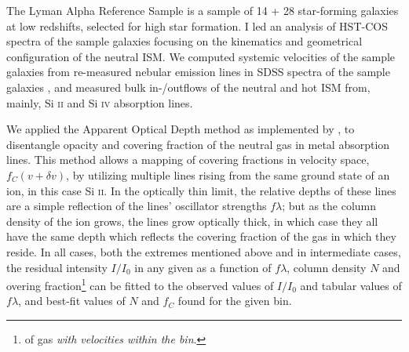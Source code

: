 \documentclass[10pt, letterpaper, headings=Large, DIV=14]{scrartcl}
\begin{document}
The Lyman Alpha Reference Sample \citep[LARS,][]{LARSI,LARSII} is a sample of 14
+ 28 star-forming galaxies at low redshifts, selected for high star formation. I
led an analysis of HST-COS spectra of the sample galaxies focusing on the
kinematics and geometrical configuration of the neutral ISM\@. We computed
systemic velocities of the sample galaxies from re-measured nebular emission
lines in SDSS spectra of the sample galaxies \citep[a number of galaxy
properties like metallicity etc.\ derived from these lines were published in the
first LARS paper ]{LARSI}, and measured bulk in-/outflows of the neutral and hot
ISM from, mainly, Si \textsc{ii} and Si \textsc{iv} absorption lines.

We applied the Apparent Optical Depth method
\citep[e.g.]{Savage1991,Pettini2002,Quider2009} as implemented by
\cite{Jones2013}, to disentangle opacity and covering fraction of the neutral
gas in metal absorption lines. This method allows a mapping of covering
fractions in velocity space,$f_C (v + \delta v)$, by utilizing multiple lines
rising from the same ground state of an ion, in this case Si \textsc{ii}. In the
optically thin limit, the relative depths of these lines are a simple reflection
of the lines' oscillator strengths $f\lambda$; but as the column density of the
ion grows, the lines grow optically thick, in which case they all have the same
depth which reflects the covering fraction of the gas in which they reside. In
all cases, both the extremes mentioned above and in intermediate cases, the
residual intensity $I/I_0$ in any given as a function of $f\lambda$, column
density $N$ and overing fraction\footnote{of gas \emph{with velocities within
the bin}.} can be fitted to the observed values of $I/I_0$ and tabular values of
$f\lambda$, and best-fit values of $N$ and $f_C$ found for the given bin. 
\end{document}
